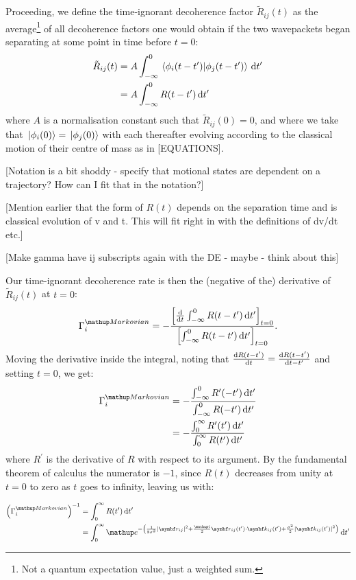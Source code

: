 Proceeding, we define the time-ignorant decoherence factor $\tilde R_{ij}(t)$ as the average\footnote{Not a quantum expectation value, just a weighted sum.} of all decoherence factors one would obtain if the two wavepackets began separating at some point in time before $t=0$:
\begin{align}
\tilde R_{ij}(t) &= A\int_{-\infty}^0\braket{\phi_i(t-t^\prime)}{\phi_j(t - t^\prime)} \,\dd t^\prime\\
&= A\int_{-\infty}^0 R(t-t^\prime) \,\dd t^\prime
\end{align}
where $A$ is a normalisation constant such that $\tilde R_{ij}(0) = 0$, and where we take that $\ket{\phi_i(0)} = \ket{\phi_j(0)}$ with each thereafter evolving according to the classical motion of their centre of mass as in [EQUATIONS].

[Notation is a bit shoddy - specify that motional states are dependent on a trajectory? How can I fit that in the notation?]

[Mention earlier that the form of $R(t)$ depends on the separation time and is classical evolution of v and t. This will fit right in with the definitions of dv/dt etc.]

[Make gamma have ij subscripts again with the DE - maybe - think about this]

Our time-ignorant decoherence rate is then the (negative of the) derivative of $\tilde R_{ij}(t)$ at $t=0$:
\begin{align}
\Gamma_i^\up{Markovian} = -\frac{\left[\dv{t}\int_{-\infty}^0 R(t-t^\prime) \,\dd t^\prime\right]_{t=0} }
{\left[\int_{-\infty}^0 R(t-t^\prime) \,\dd t^\prime\right]_{t=0}}.
\end{align}
Moving the derivative inside the integral, noting that $\dv{R(t - t^\prime)}{t} = \dv{R(t - t^\prime)}{t - t^\prime}$ and setting $t = 0$, we get:
\begin{align}
\Gamma_i^\up{Markovian} &= -\frac
{\int_{-\infty}^0 R^\prime(-t^\prime) \,\dd t^\prime}
{\int_{-\infty}^0 R(-t^\prime) \,\dd t^\prime}\\
&= -\frac
{\int_0^\infty R^\prime(t^\prime) \,\dd t^\prime}
{\int_0^\infty R(t^\prime) \,\dd t^\prime}
\end{align}
where $R^\prime$ is the derivative of $R$ with respect to its argument. By the fundamental theorem of calculus the numerator is $-1$, since $R(t)$ decreases from unity at $t=0$ to zero as $t$ goes to infinity, leaving us with:

\begin{align}
\left(\Gamma_i^\up{Markovian}\right)^{-1} &= 
  \int_0^\infty R(t^\prime) \,\dd t^\prime\\
&= \int_0^\infty \ee^{-\left(\frac1{8\sigma^2}\abs{\vec r_{ij}}^2
+ \frac\ii 2 \vec r_{ij}(t^\prime) \cdot \vec k_{ij}(t^\prime) + \frac{\sigma^2}{2} \abs{\vec k_{ij}(t^\prime)}^2
\right)} \,\dd t^\prime
\end{align}

